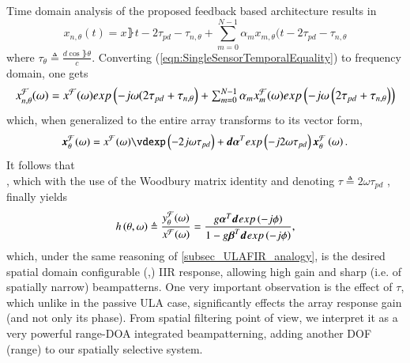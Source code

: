 \else
    Time domain analysis of the proposed feedback based architecture results in 
    \begin{equation}
        \label{eqn:SingleSensorTemporalEquality}
        x_{n,\theta}(t) = x\rBrace{t-2\tau_{pd}-\tau_{n,\theta}}+\sum_{m=0}^{N-1}{\alpha_{m}x_{m,\theta}(t-2\tau_{pd}-\tau_{n,\theta}}
    \end{equation}
    where $\tau_{\theta} \triangleq \frac{d\cos\rBrace{\theta}}{c}$.
    Converting (\ref{eqn:SingleSensorTemporalEquality}) to frequency domain, one gets
    \begin{equation}
    \resizebox{\linewidth}{!}{%
            $
            x_{n,\theta}^{\mathcal{F}}(\omega) = 
            x^{\mathcal{F}}(\omega)
            exp\rBrace{-j\omega(2\tau_{pd}+\tau_{n,\theta}}
            +\sum_{m=0}^{N-1}
            {
            \alpha_{m}x_{m}^{\mathcal{F}}(\omega)
            exp\rBrace{-j\omega\rBrace{2\tau_{pd}+\tau_{n,\theta}}}
            } 
            $}
    \end{equation} 
    which, when generalized to the entire array transforms to its vector form,
    \begin{equation}
    \vx^{\mathcal{F}}_{\theta}(\omega) = 
    x^{\mathcal{F}}(\omega)\vdexp\rBrace{-2j\omega\tau_{pd}}
    +
    \vd\vAlphaT{}exp\rBrace{-j2\omega\tau_{pd}}\vx_{\theta}^{\mathcal{F}}\rBrace{\omega}.
    \end{equation}
    It follows that
    $$
    
    $$
    , which with the use of the Woodbury matrix identity \cite{woodbury1950inverting} and denoting $\tau\triangleq2\omega\tau_{pd}$ , finally yields
    \begin{equation}
        \label{eqn:GeneralFeedbackTransferFunction}
        h\rBrace{\theta,\omega} 
        \triangleq
        \frac{y_{\theta}^{\mathcal{F}}(\omega)}{x^{\mathcal{F}}(\omega)} 
        =
        \frac{    
        g\aTd{}exp\rBrace{-j\phi}
        }{
        1 - g\bTd{}exp\rBrace{-j\phi}
        },
    \end{equation}
    which, under the same reasoning of \ref{subsec_ULAFIR_analogy}, is the desired spatial domain configurable (\vBeta,\vAlpha) IIR response, allowing high gain and sharp (i.e. of spatially narrow) beampatterns.
    One very important observation is the effect of $\tau$, which unlike in the passive ULA case, significantly effects the array response gain (and not only its phase).
    From spatial filtering point of view, we interpret it as a very powerful range-DOA integrated beampatterning, adding another DOF (range) to our spatially selective system.
